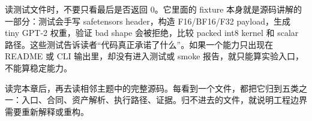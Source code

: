 读测试文件时，不要只看最后是否返回 0。它里面的 fixture 本身就是源码讲解的一部分：测试会手写 safetensors header，构造 F16/BF16/F32 payload，生成 tiny GPT-2 权重，验证 bad shape 会被拒绝，比较 packed int8 kernel 和 scalar 路径。这些测试告诉读者“代码真正承诺了什么”。如果一个能力只出现在 README 或 CLI 输出里，却没有进入测试或 smoke 报告，就只能算实验入口，不能算稳定能力。

\begin{sourcereadingbox}
读完本章后，再去读相邻主题中的完整源码。每看到一个文件，都把它归到五类之一：入口、合同、资产解析、执行路径、证据。归不进去的文件，就说明工程边界需要重新解释或重构。
\end{sourcereadingbox}
